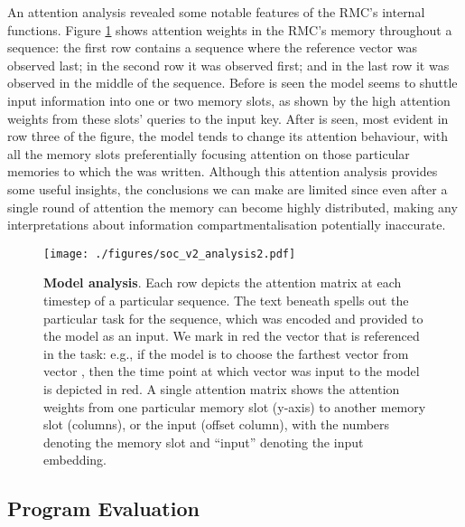 \documentclass{article}
\begin{document}
An attention analysis revealed some notable features of the RMC's internal functions. Figure \ref{fig:analysis} shows attention weights in the RMC's memory throughout a sequence: the first row contains a sequence where the reference vector  was observed last; in the second row it was observed first; and in the last row it was observed in the middle of the sequence. Before  is seen the model seems to shuttle input information into one or two memory slots, as shown by the high attention weights from these slots' queries to the input key. After  is seen, most evident in row three of the figure, the model tends to change its attention behaviour, with all the memory slots preferentially focusing attention on those particular memories to which the  was written. Although this attention analysis provides some useful insights, the conclusions we can make are limited since even after a single round of attention the memory can become highly distributed, making any interpretations about information compartmentalisation potentially inaccurate.

\begin{figure}
    \centering
    \texttt{[image: ./figures/soc\_v2\_analysis2.pdf]}
    \caption{\textbf{Model analysis}. Each row depicts the attention matrix at each timestep of a particular sequence. The text beneath spells out the particular task for the sequence, which was encoded and provided to the model as an input. We mark in red the vector that is referenced in the task: e.g., if the model is to choose the  farthest vector from vector , then the time point at which vector  was input to the model is depicted in red. A single attention matrix shows the attention weights from one particular memory slot (y-axis) to another memory slot (columns), or the input (offset column), with the numbers denoting the memory slot and ``input'' denoting the input embedding.}
    \label{fig:analysis}
\end{figure}

\subsection{Program Evaluation}
\end{document}
